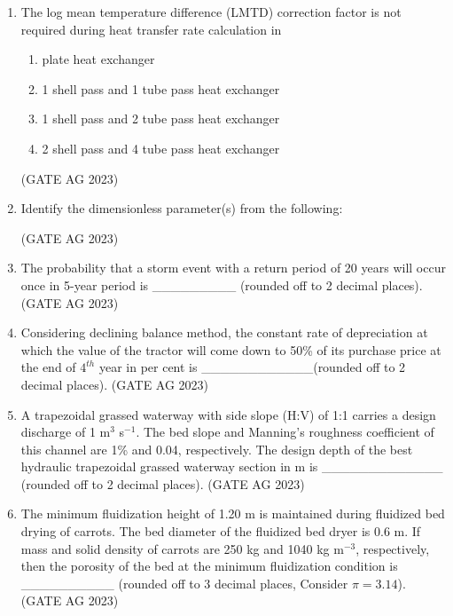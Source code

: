 \documentclass[journal,12pt,onecolumn]{IEEEtran}
\theoremstyle{remark}
\begin{document}
\begin{enumerate}
    \item The log mean temperature difference (LMTD) correction factor is not required during heat transfer rate calculation in
    \begin{enumerate}
        \item plate heat exchanger
        \item 1 shell pass and 1 tube pass heat exchanger
        \item 1 shell pass and 2 tube pass heat exchanger
        \item 2 shell pass and 4 tube pass heat exchanger
    \end{enumerate}
\hfill{(GATE AG 2023)}

    \item Identify the dimensionless parameter(s) from the following:
    \begin{enumerate}
    \end{enumerate}
\hfill{(GATE AG 2023)}

    \item The probability that a storm event with a return period of 20 years will occur once in 5-year period is \_\_\_\_\_\_\_\_\_ (rounded off to 2 decimal places).
\hfill{(GATE AG 2023)}

    \item Considering declining balance method, the constant rate of depreciation at which the value of the tractor will come down to 50\% of its purchase price at the end of $4^{th}$ year in per cent is \_\_\_\_\_\_\_\_\_\_\_\_(rounded off to 2 decimal places).
\hfill{(GATE AG 2023)}

    \item A trapezoidal grassed waterway with side slope (H:V) of 1:1 carries a design discharge of 1 m$^{3}$ s$^{-1}$. The bed slope and Manning's roughness coefficient of this channel are 1\% and 0.04, respectively. The design depth of the best hydraulic trapezoidal grassed waterway section in m is \_\_\_\_\_\_\_\_\_\_\_\_\_ (rounded off to 2 decimal places).
\hfill{(GATE AG 2023)}

    \item The minimum fluidization height of 1.20 m is maintained during fluidized bed drying of carrots. The bed diameter of the fluidized bed dryer is 0.6 m. If mass and solid density of carrots are 250 kg and 1040 kg m$^{-3}$, respectively, then the porosity of the bed at the minimum fluidization condition is \_\_\_\_\_\_\_\_\_\_ (rounded off to 3 decimal places, Consider $\pi = 3.14$).
\hfill{(GATE AG 2023)}


\end{enumerate}
\end{document}
